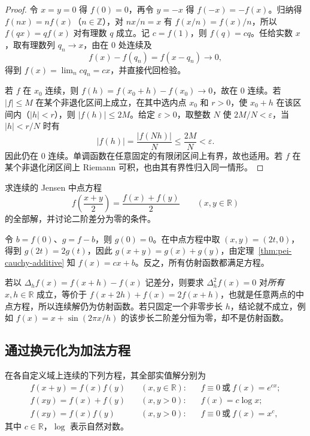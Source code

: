 \begin{proof}
令 $x=y=0$ 得 $f(0)=0$，再令 $y=-x$ 得 $f(-x)=-f(x)$。归纳得 $f(nx)=nf(x)$（$n\in\mathbb Z$），对 $nx/n=x$ 有 $f(x/n)=f(x)/n$，所以 $f(qx)=qf(x)$ 对有理数 $q$ 成立。记 $c=f(1)$，则 $f(q)=cq$。任给实数 $x$，取有理数列 $q_n\to x$，由在 $0$ 处连续及
\[
f(x)-f(q_n)=f(x-q_n)\to0,
\]
得到 $f(x)=\lim_ncq_n=cx$，并直接代回检验。

若 $f$ 在 $x_0$ 连续，则 $f(h)=f(x_0+h)-f(x_0)\to0$，故在 $0$ 连续。若 $|f|\le M$ 在某个非退化区间上成立，在其中选内点 $x_0$ 和 $r>0$，使 $x_0+h$ 在该区间内（$|h|<r$），则 $|f(h)|\le2M$。给定 $\varepsilon>0$，取整数 $N$ 使 $2M/N<\varepsilon$，当 $|h|<r/N$ 时有
\[
|f(h)|=\frac{|f(Nh)|}{N}\le\frac{2M}{N}<\varepsilon.
\]
因此仍在 $0$ 连续。单调函数在任意固定的有限闭区间上有界，故也适用。若 $f$ 在某个非退化闭区间上 Riemann 可积，也由其有界性归入同一情形。
\end{proof}

\begin{example}
求连续的 Jensen 中点方程
\[
f\left(\frac{x+y}{2}\right)=\frac{f(x)+f(y)}2\qquad(x,y\in\mathbb R)
\]
的全部解，并讨论二阶差分为零的条件。
\end{example}

\begin{solve}
令 $b=f(0)$、$g=f-b$，则 $g(0)=0$。在中点方程中取 $(x,y)=(2t,0)$，得到 $g(2t)=2g(t)$，因此 $g(x+y)=g(x)+g(y)$，由定理~\ref{thm:pei-cauchy-additive} 知 $f(x)=cx+b$。反之，所有仿射函数都满足方程。

若以 $\Delta_hf(x)=f(x+h)-f(x)$ 记差分，则要求 $\Delta_h^2f(x)=0$ 对\emph{所有 $x,h\in\mathbb R$} 成立，等价于 $f(x+2h)+f(x)=2f(x+h)$，也就是任意两点的中点方程，所以连续解仍为仿射函数。若只固定一个非零步长 $h$，结论就不成立，例如 $f(x)=x+\sin(2\pi x/h)$ 的该步长二阶差分恒为零，却不是仿射函数。
\end{solve}

\subsection{通过换元化为加法方程}

\begin{proposition}
\label{prop:pei-exponential-equations}
在各自定义域上连续的下列方程，其全部实值解分别为
\[
\begin{aligned}
f(x+y)=f(x)f(y)\quad &(x,y\in\mathbb R):
&&f\equiv0\ \text{或}\ f(x)=e^{cx};\\
f(xy)=f(x)+f(y)\quad &(x,y>0):
&&f(x)=c\log x;\\
f(xy)=f(x)f(y)\quad &(x,y>0):
&&f\equiv0\ \text{或}\ f(x)=x^c,
\end{aligned}
\]
其中 $c\in\mathbb R$，$\log$ 表示自然对数。
\end{proposition}

